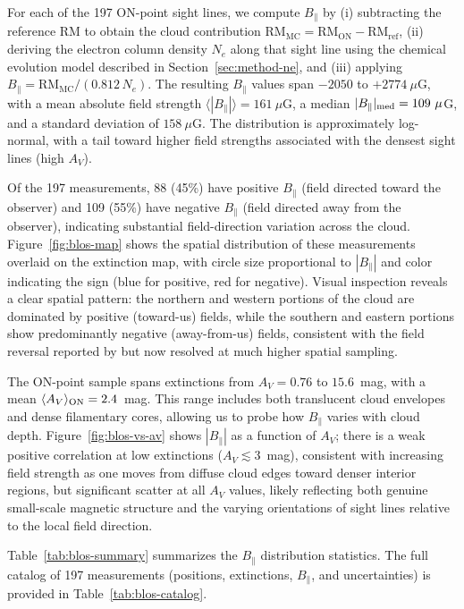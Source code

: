 \documentclass[twocolumn]{aastex631}
\begin{document}
For each of the 197 ON-point sight lines, we compute $B_\parallel$ by (i) subtracting the reference RM to obtain the cloud contribution $\mathrm{RM_{MC}} = \mathrm{RM_{ON}} - \mathrm{RM_{ref}}$, (ii) deriving the electron column density $N_e$ along that sight line using the chemical evolution model described in Section~\ref{sec:method-ne}, and (iii) applying $B_\parallel = \mathrm{RM_{MC}} / (0.812\,N_e)$. The resulting $B_\parallel$ values span $-2050$ to $+2774~\mu$G, with a mean absolute field strength $\langle |B_\parallel| \rangle = 161~\mu$G, a median $|B_\parallel|_{\rm med} = 109~\mu$G, and a standard deviation of $158~\mu$G. The distribution is approximately log-normal, with a tail toward higher field strengths associated with the densest sight lines (high $A_V$).

Of the 197 measurements, 88 (45\%) have positive $B_\parallel$ (field directed toward the observer) and 109 (55\%) have negative $B_\parallel$ (field directed away from the observer), indicating substantial field-direction variation across the cloud. Figure~\ref{fig:blos-map} shows the spatial distribution of these measurements overlaid on the extinction map, with circle size proportional to $|B_\parallel|$ and color indicating the sign (blue for positive, red for negative). Visual inspection reveals a clear spatial pattern: the northern and western portions of the cloud are dominated by positive (toward-us) fields, while the southern and eastern portions show predominantly negative (away-from-us) fields, consistent with the field reversal reported by \citet{tahani2018} but now resolved at much higher spatial sampling.

The ON-point sample spans extinctions from $A_V = 0.76$ to $15.6$~mag, with a mean $\langle A_V \rangle_{\rm ON} = 2.4$~mag. This range includes both translucent cloud envelopes and dense filamentary cores, allowing us to probe how $B_\parallel$ varies with cloud depth. Figure~\ref{fig:blos-vs-av} shows $|B_\parallel|$ as a function of $A_V$; there is a weak positive correlation at low extinctions ($A_V \lesssim 3$~mag), consistent with increasing field strength as one moves from diffuse cloud edges toward denser interior regions, but significant scatter at all $A_V$ values, likely reflecting both genuine small-scale magnetic structure and the varying orientations of sight lines relative to the local field direction.

Table~\ref{tab:blos-summary} summarizes the $B_\parallel$ distribution statistics. The full catalog of 197 measurements (positions, extinctions, $B_\parallel$, and uncertainties) is provided in Table~\ref{tab:blos-catalog}.
\end{document}
